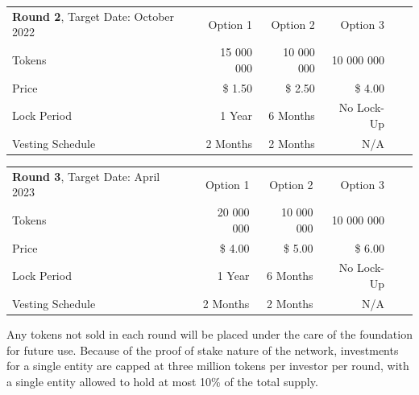 \documentclass[a4paper,oneside]{article}
\begin{document}
\renewcommand{\arraystretch}{1.5}%
\begin{flushleft}
	\hypersetup{colorlinks = true, urlcolor = black, citecolor = black, linkcolor = black}
	\center \small
	\begin{tabular}{lrrrrr}
		\rowcolor{orange}\color{black}\textbf{Round 2}, Target Date: October 2022\hspace{1.9cm} & \color{black}Option 1 & \color{black}Option 2 & \color{black}Option 3\\
		Tokens                               &  15 000 000 & 10 000 000 & 10 000 000 \\
		\rowcolor{headerbgl}Price            &  \$ 1.50    & \$ 2.50    & \$ 4.00 \\
		Lock Period                          &  1 Year     &  6 Months  & No Lock-Up \\
		\rowcolor{headerbgl}Vesting Schedule &  2 Months   & 2 Months & N/A 
	\end{tabular}
\end{flushleft}

\renewcommand{\arraystretch}{1.5}%
\begin{flushleft}
	\hypersetup{colorlinks = true, urlcolor = black, citecolor = black, linkcolor = black}
	\center \small
	\begin{tabular}{lrrrrr}
		\rowcolor{orange}\color{black}\textbf{Round 3}, Target Date: April 2023\hspace{2.35cm} & \color{black}Option 1 & \color{black}Option 2 & \color{black}Option 3\\
		Tokens                               &  20 000 000 & 10 000 000 & 10 000 000 \\
		\rowcolor{headerbgl}Price            &  \$ 4.00    & \$ 5.00    & \$ 6.00 \\
		Lock Period                          &  1 Year     &  6 Months  & No Lock-Up \\
		\rowcolor{headerbgl}Vesting Schedule &  2 Months   & 2 Months & N/A 
	\end{tabular}
\end{flushleft}

\vspace{0.6cm}
\noindent Any tokens not sold in each round will be placed under the care of the foundation for future use. Because of the proof of stake nature of the  network, investments for a single entity are capped at three million tokens per investor per round, with a single entity allowed to hold at most 10\% of the total supply.
\end{document}
